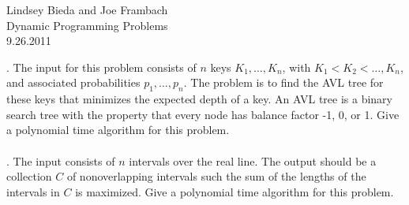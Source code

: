 \documentclass[10pt]{article}
\begin{document}
	\begin{flushright}
	Lindsey Bieda and Joe Frambach\\
	Dynamic Programming Problems\\
	9.26.2011
	\end{flushright}
	.	The input for this problem consists of $n$ keys $K_1, \ldots, K_n$, with $K_1 < K_2 < \ldots , K_n$, and associated
			probabilities $p_1, \ldots, p_n$. The problem is to find the AVL tree for these keys that minimizes the expected
			depth of a key.  An AVL tree is a binary search tree with the property that every node has balance
			factor -1, 0, or 1. Give a polynomial time algorithm for this problem.\\
			\\
	.	The input consists of $n$ intervals over the real line. The output should be a collection $C$  of nonoverlapping 
			intervals such the sum of the lengths of the intervals in $C$ is maximized. Give a polynomial
			time algorithm for this problem.\\
			\\
\end{document}
